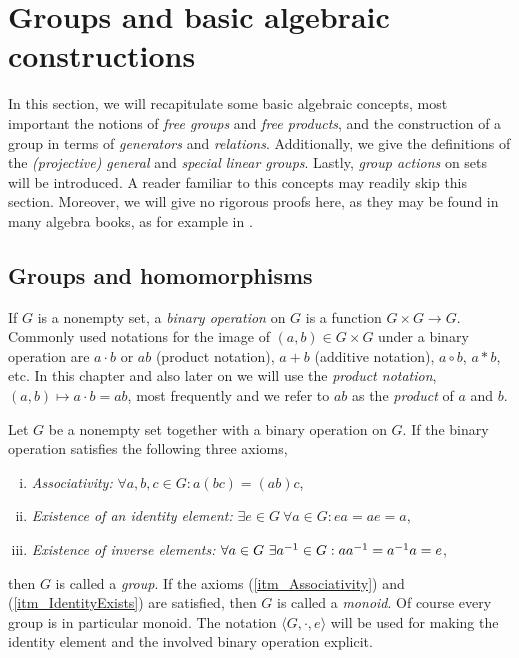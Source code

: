 \section{Groups and basic algebraic constructions}

In this section, we will recapitulate some basic algebraic concepts, most important the notions of \emph{free groups} and \emph{free products}, and the construction of a group in terms of \emph{generators} and \emph{relations}. Additionally, we give the definitions of the \emph{(projective) general} and \emph{special linear groups}. Lastly, \emph{group actions} on sets will be introduced. A reader familiar to this concepts may readily skip this section. Moreover, we will give no rigorous proofs here, as they may be found in many algebra books, as for example in \Hungerford.

\subsection{Groups and homomorphisms}

If $G$ is a nonempty set, a \emph{binary operation} on $G$ is a function $G \times G \to G$. Commonly used notations for the image of $(a,b) \in G \times G$ under a binary operation are $a \cdot b$ or $ab$ (product notation), $a + b$ (additive notation), $a \circ b$, $a \ast b$, etc. In this chapter and also later on we will use the \emph{product notation}, $(a,b) \mapsto a \cdot b =  ab$, most frequently and we refer to $ab$ as the \emph{product} of $a$ and $b$.

\begin{definition}
\label{dfn_GroupMonoid}
Let $G$ be a nonempty set together with a binary operation on $G$. If the binary operation satisfies the following three axioms,
\begin{enumerate}[(i)]
\item \label{itm_Associativity} \emph{Associativity:} $\forall a,b,c \in G: a(bc) = (ab)c$,
\item \label{itm_IdentityExists} \emph{Existence of an identity element:} $\exists e \in G\ \forall a \in G: ea = ae = a$,
\item \emph{Existence of inverse elements:} $\forall a \in G\ \exists {a}^{-1} \in G: a {a}^{-1} = {a}^{-1} a = e$,
\end{enumerate}
then $G$ is called a \emph{group}. If the axioms (\ref{itm_Associativity}) and (\ref{itm_IdentityExists}) are satisfied, then $G$ is called a \emph{monoid}. Of course every group is in particular monoid. The notation $\langle G,\cdot,e \rangle$ will be used for making the identity element and the involved binary operation explicit.
\end{definition}


